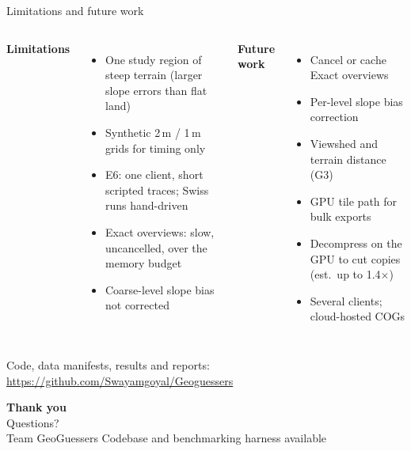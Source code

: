\documentclass[aspectratio=169,11pt]{beamer}
\begin{document}
\begin{frame}{Limitations and future work}
\begin{columns}[T]
\textbf{Limitations}
\small
\begin{itemize}
  \item One study region of steep terrain (larger slope errors than flat land)
  \item Synthetic 2\,m / 1\,m grids for timing only
  \item E6: one client, short scripted traces; Swiss runs hand-driven
  \item Exact overviews: slow, uncancelled, over the memory budget
  \item Coarse-level slope bias not corrected
\end{itemize}
\textbf{Future work}
\small
\begin{itemize}
  \item Cancel or cache Exact overviews
  \item Per-level slope bias correction
  \item Viewshed and terrain distance (G3)
  \item GPU tile path for bulk exports
  \item Decompress on the GPU to cut copies (est.\ up to 1.4$\times$)
  \item Several clients; cloud-hosted COGs
\end{itemize}
\end{columns}
\vfill
\centering\small Code, data manifests, results and reports: \url{https://github.com/Swayamgoyal/Geoguessers}
\end{frame}

\begin{frame}[plain]
\vfill\centering
{\Huge\bfseries\color{navy} Thank you}\\[10pt]
{\Large\color{accent} Questions?}\\[16pt]
{\small Team GeoGuessers \;\textperiodcentered\; Codebase and benchmarking harness available}
\vfill
\end{frame}
\end{document}
